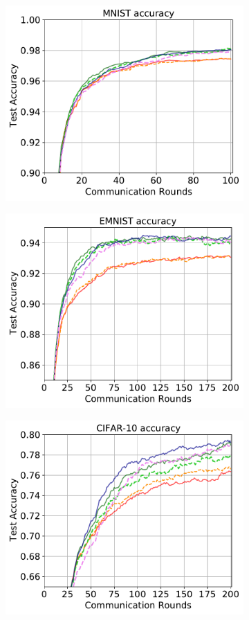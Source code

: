 \documentclass{article} %
\begin{document}
\begin{figure}[ht!]
\begin{subfigure}{.5\textwidth}
  \centering
  \includegraphics[width=.8\linewidth]{mnist_0.3.pdf}
  \label{fig:sub-first}
\end{subfigure}
\begin{subfigure}{.5\textwidth}
  \centering
  \includegraphics[width=.8\linewidth]{emnit_0.3.pdf}
  \label{fig:sub-second}
\end{subfigure}
\begin{subfigure}{.5\textwidth}
  \centering
  \includegraphics[width=.8\linewidth]{cifar10_0.3.pdf}

\end{subfigure}
\end{figure}
\end{document}
